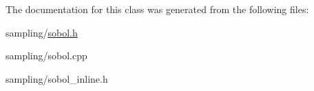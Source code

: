 \-The documentation for this class was generated from the following files\-:\begin{DoxyCompactItemize}
\item 
sampling/\hyperlink{sobol_8h}{sobol.\-h}\item 
sampling/sobol.\-cpp\item 
sampling/sobol\-\_\-inline.\-h\end{DoxyCompactItemize}
